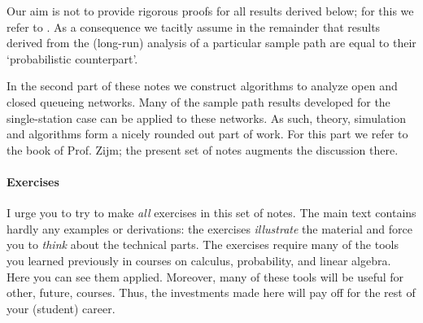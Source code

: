 Our aim is not to provide rigorous proofs for all results derived below; for this we refer to
\cite{el-taha98:_sampl_path_analy_queuein_system}. As a consequence we tacitly
assume in the remainder that results derived from the (long-run)
analysis of a particular sample path are equal to their `probabilistic
counterpart'. 

In the second part of these notes we construct algorithms to analyze open and closed
queueing networks. Many of the sample path results developed for the
single-station case can be applied to these networks. As such, theory,
simulation and algorithms form a nicely rounded out part of work.  For
this part we refer to the book of Prof. Zijm; the present set of notes
augments the discussion there.


\paragraph{Exercises}

I urge you to try to make \emph{all} exercises in this set of notes.
The main text contains hardly any examples or derivations: the exercises \emph{illustrate} the material and force you to \textit{think} about the technical parts.
The exercises require many of the tools you learned previously in courses on calculus, probability, and linear algebra.
Here you can see them applied.
Moreover, many of these tools will be useful for other, future, courses.
Thus, the investments made here will pay off for the rest of your (student) career.


